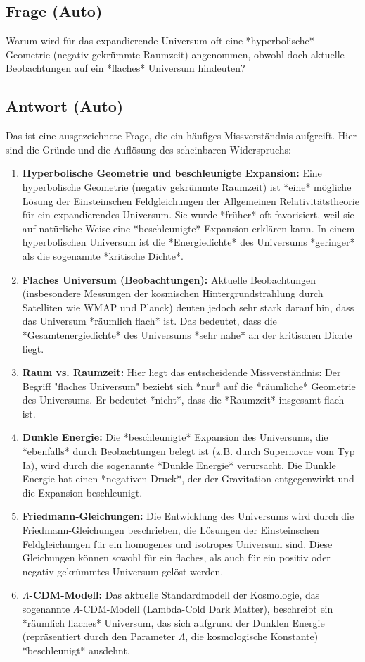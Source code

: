 \documentclass{article}
\begin{document}
	\subsection{Frage (Auto)}
	Warum wird für das expandierende Universum oft eine *hyperbolische* Geometrie (negativ gekrümmte Raumzeit) angenommen, obwohl doch aktuelle Beobachtungen auf ein *flaches* Universum hindeuten?
	
	\subsection{Antwort (Auto)}
	Das ist eine ausgezeichnete Frage, die ein häufiges Missverständnis aufgreift. Hier sind die Gründe und die Auflösung des scheinbaren Widerspruchs:
	
	\begin{enumerate}
		\item \textbf{Hyperbolische Geometrie und beschleunigte Expansion:} Eine hyperbolische Geometrie (negativ gekrümmte Raumzeit) ist *eine* mögliche Lösung der Einsteinschen Feldgleichungen der Allgemeinen Relativitätstheorie für ein expandierendes Universum. Sie wurde *früher* oft favorisiert, weil sie auf natürliche Weise eine *beschleunigte* Expansion erklären kann. In einem hyperbolischen Universum ist die *Energiedichte* des Universums *geringer* als die sogenannte *kritische Dichte*.
		\item \textbf{Flaches Universum (Beobachtungen):} Aktuelle Beobachtungen (insbesondere Messungen der kosmischen Hintergrundstrahlung durch Satelliten wie WMAP und Planck) deuten jedoch sehr stark darauf hin, dass das Universum *räumlich flach* ist. Das bedeutet, dass die *Gesamtenergiedichte* des Universums *sehr nahe* an der kritischen Dichte liegt.
		\item \textbf{Raum vs. Raumzeit:} Hier liegt das entscheidende Missverständnis: Der Begriff "flaches Universum" bezieht sich *nur* auf die *räumliche* Geometrie des Universums.  Er bedeutet *nicht*, dass die *Raumzeit* insgesamt flach ist.
		\item \textbf{Dunkle Energie:} Die *beschleunigte* Expansion des Universums, die *ebenfalls* durch Beobachtungen belegt ist (z.B. durch Supernovae vom Typ Ia), wird durch die sogenannte *Dunkle Energie* verursacht. Die Dunkle Energie hat einen *negativen Druck*, der der Gravitation entgegenwirkt und die Expansion beschleunigt.
		\item \textbf{Friedmann-Gleichungen:} Die Entwicklung des Universums wird durch die Friedmann-Gleichungen beschrieben, die Lösungen der Einsteinschen Feldgleichungen für ein homogenes und isotropes Universum sind.  Diese Gleichungen können sowohl für ein flaches, als auch für ein positiv oder negativ gekrümmtes Universum gelöst werden.
		\item \textbf{\(\Lambda\)-CDM-Modell:} Das aktuelle Standardmodell der Kosmologie, das sogenannte \(\Lambda\)-CDM-Modell (Lambda-Cold Dark Matter), beschreibt ein *räumlich flaches* Universum, das sich aufgrund der Dunklen Energie (repräsentiert durch den Parameter \(\Lambda\), die kosmologische Konstante) *beschleunigt* ausdehnt.
	\end{enumerate}
	
\end{document}
